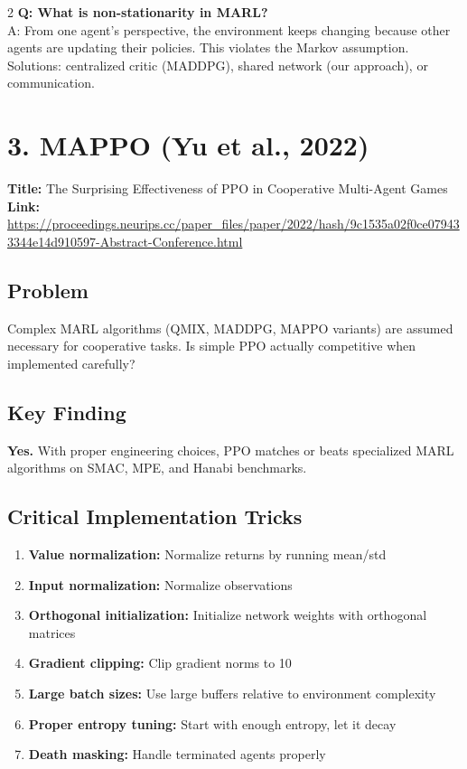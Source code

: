 \documentclass[10pt,a4paper]{article}
\begin{document}
\begin{multicols}{2}
\textbf{Q: What is non-stationarity in MARL?} \\
A: From one agent's perspective, the environment keeps changing because other agents are updating their policies. This violates the Markov assumption. Solutions: centralized critic (MADDPG), shared network (our approach), or communication.

\section{3. MAPPO (Yu et al., 2022)}

\textbf{Title:} The Surprising Effectiveness of PPO in Cooperative Multi-Agent Games \\
\textbf{Link:} \url{https://proceedings.neurips.cc/paper_files/paper/2022/hash/9c1535a02f0ce079433344e14d910597-Abstract-Conference.html}

\subsection{Problem}
Complex MARL algorithms (QMIX, MADDPG, MAPPO variants) are assumed necessary for cooperative tasks. Is simple PPO actually competitive when implemented carefully?

\subsection{Key Finding}
\textbf{Yes.} With proper engineering choices, PPO matches or beats specialized MARL algorithms on SMAC, MPE, and Hanabi benchmarks.

\subsection{Critical Implementation Tricks}
\begin{enumerate}
\item \textbf{Value normalization:} Normalize returns by running mean/std
\item \textbf{Input normalization:} Normalize observations
\item \textbf{Orthogonal initialization:} Initialize network weights with orthogonal matrices
\item \textbf{Gradient clipping:} Clip gradient norms to 10
\item \textbf{Large batch sizes:} Use large buffers relative to environment complexity
\item \textbf{Proper entropy tuning:} Start with enough entropy, let it decay
\item \textbf{Death masking:} Handle terminated agents properly
\end{enumerate}


\end{multicols}
\end{document}
